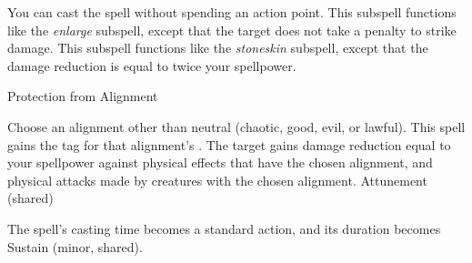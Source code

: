 You can cast the spell without spending an action point.
This subspell functions like the \textit{enlarge} subspell, except that the target does not take a penalty to strike damage.
This subspell functions like the \textit{stoneskin} subspell, except that the damage reduction is equal to twice your spellpower.
\begin{spellsection}{Protection from Alignment}
\begin{spellcontent}
\begin{spelltargetinginfo}
\end{spelltargetinginfo}
\begin{spelleffects}
\spellspecial
Choose an alignment other than neutral (chaotic, good, evil, or lawful).
This spell gains the tag for that alignment's .
\spelleffect
The target gains damage reduction equal to your spellpower against physical effects that have the chosen alignment, and physical attacks made by creatures with the chosen alignment.
\spelldur Attunement (shared)
\end{spelleffects}
\end{spellcontent}
\begin{spellfooter}
\end{spellfooter}
\begin{spellsubcontent}
\begin{spellcantrip}
The spell's casting time becomes a standard action, and its duration becomes Sustain (minor, shared).
\end{spellcantrip}
\end{spellsubcontent}
\end{spellsection}
